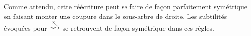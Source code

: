 Comme attendu, cette réécriture peut se faire de façon parfaitement symétrique
en faisant monter une coupure dans le sous-arbre de droite. Les subtilités
évoquées pour $\reecr{\nwarrow}$ se retrouvent de façon symétrique dans ces
règles.

\begin{table}[t!]
  \centering
\end{table}
